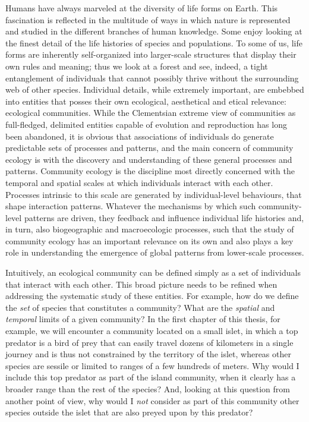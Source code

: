 Humans have always marveled at the diversity of life forms on Earth. This fascination is reflected in the multitude of ways in which nature is represented and studied in the different branches of human knowledge. Some enjoy looking at the finest detail of the life histories of species and populations. To some of us, life forms are inherently self-organized into larger-scale structures that display their own rules and meaning; thus we look at a forest and see, indeed, a tight entanglement of individuals that cannot possibly thrive without the surrounding web of other species. Individual details, while extremely important, are embebbed into entities that posses their own ecological, aesthetical and etical relevance: ecological communities. While the Clementsian extreme view of communities as full-fledged, delimited entities capable of evolution and reproduction has long been abandoned, it is obvious that associations of individuals do generate predictable sets of processes and patterns, and the main concern of community ecology is with the discovery and understanding of these general processes and patterns. Community ecology is the discipline most directly concerned with the temporal and spatial scales at which individuals interact with each other. Processes intrinsic to this scale are generated by individual-level behaviours, that shape interaction patterns. Whatever the mechanisms by which such community-level patterns are driven, they feedback and influence individual life histories and, in turn, also biogeographic and macroecologic processes, such that the study of community ecology has an important relevance on its own and also plays a key role in understanding the emergence of global patterns from lower-scale processes.

Intuitively, an ecological community can be defined simply as a set of individuals that interact with each other. This broad picture needs to be refined when addressing the systematic study of these entities. For example, how do we define the \textit{set} of species that constitutes a community? What are the \textit{spatial} and \textit{temporal} limits of a given community? In the first chapter of this thesis, for example, we will encounter a community located on a small islet, in which a top predator is a bird of prey that can easily travel dozens of kilometers in a single journey and is thus not constrained by the territory of the islet, whereas other species are sessile or limited to ranges of a few hundreds of meters. Why would I include this top predator as part of the island community, when it clearly has a broader range than the rest of the species? And, looking at this question from another point of view, why would I \textit{not} consider as part of this community other species outside the islet that are also preyed upon by this predator?


